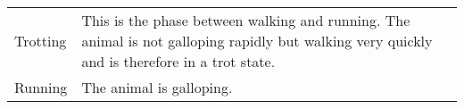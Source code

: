 \begin{table}[!tbh]
{\begin{tabular}{p{0.1\linewidth}p{0.9\linewidth}}
			Trotting          & This is the phase between walking and running. The animal is not galloping rapidly but walking very quickly and is therefore in a trot state.                                                                                                      \\
			Running           & The animal is galloping.                                                                                                                                                                                                         \\ \bottomrule
		\end{tabular}
	}
\end{table}